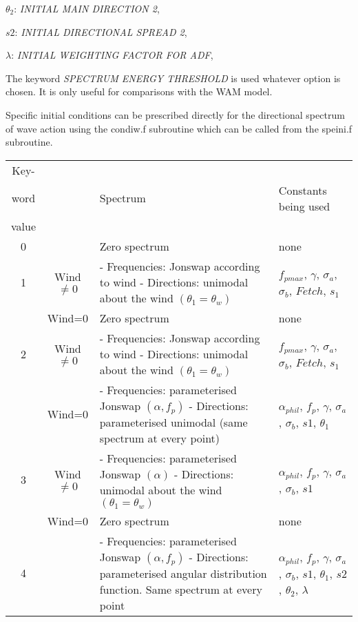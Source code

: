  $\theta_2$:  \textit{INITIAL MAIN DIRECTION 2},

 $s2$:  \textit{INITIAL DIRECTIONAL SPREAD 2},

 $\lambda$:  \textit{INITIAL WEIGHTING FACTOR FOR ADF},


 The keyword \textit{SPECTRUM ENERGY THRESHOLD} is used whatever option is chosen. It is only useful for comparisons with the WAM model.

 Specific initial conditions can be prescribed directly for the directional spectrum of wave action using the condiw.f subroutine which can be called from the speini.f subroutine.

\begin{table}
\begin{tabular}{|c|c|p{2.2in}|p{1.8in}|} \hline
Key- &  &  &  \\ 
word  &  & Spectrum & Constants  being used \\ 
 value &  & &  \\ \hline
0 &  & Zero spectrum & none \\ \hline
1 & Wind$\ne 0$ & - Frequencies: Jonswap according to wind  \newline - Directions: unimodal about the wind $(\theta_1 = \theta_w)$ & $f_{pmax}$, $ \gamma $, $ \sigma_a$, $ \sigma_b$, $Fetch$, $ s_1 $  \\ \hline
 & Wind=0 & Zero spectrum & none \\ \hline
2 & Wind$\ne 0$ & - Frequencies: Jonswap according to wind \newline - Directions: unimodal about the wind $(\theta_1 = \theta_w)$ & $f_{pmax}$, $ \gamma $, $ \sigma_a$, $ \sigma_b$, $Fetch$, $ s_1 $ \\ \hline
 & Wind=0 & - Frequencies: parameterised Jonswap $(\alpha , f_p)$ \newline - Directions: parameterised unimodal (same spectrum at every point) & $\alpha_{phil}$, $ f_p$, $ \gamma $, $ \sigma_a$, $ \sigma_b$, $ s1$, $ \theta_1$ \\ \hline
3 & Wind$\ne0$ & - Frequencies: parameterised Jonswap $(\alpha)$ \newline - Directions: unimodal about the wind $(\theta_1 = \theta_w)$ & $\alpha_{phil}$, $ f_p$, $ \gamma $, $ \sigma_a$, $ \sigma_b$, $ s1$ \\ \hline
 & Wind=0 & Zero spectrum & none \\ \hline
4 &  & - Frequencies: parameterised Jonswap $(\alpha , f_p)$  \newline  - Directions: parameterised angular distribution function. Same spectrum at every point& $\alpha_{phil}$, $ f_p$, $ \gamma $, $ \sigma_a$, $ \sigma_b$, $ s1$, $ \theta_1$, $ s2$, $ \theta_2$, $ \lambda$ \\ \hline

\end{tabular}
\end{table}
